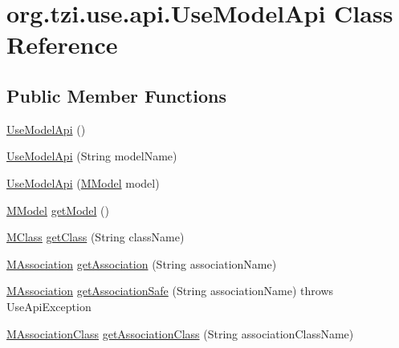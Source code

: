 \hypertarget{classorg_1_1tzi_1_1use_1_1api_1_1_use_model_api}{\section{org.\-tzi.\-use.\-api.\-Use\-Model\-Api Class Reference}
\label{classorg_1_1tzi_1_1use_1_1api_1_1_use_model_api}
}
\subsection*{Public Member Functions}
\begin{DoxyCompactItemize}
\item 
\hyperlink{classorg_1_1tzi_1_1use_1_1api_1_1_use_model_api_a8771dcfe5fbfff7b9dd39e2ab838dda9}{Use\-Model\-Api} ()
\item 
\hyperlink{classorg_1_1tzi_1_1use_1_1api_1_1_use_model_api_ae19c8c6bdd9a600347fea10d10f83c91}{Use\-Model\-Api} (String model\-Name)
\item 
\hyperlink{classorg_1_1tzi_1_1use_1_1api_1_1_use_model_api_a5917d6c8644a6d3a1e532ea49b1eb60b}{Use\-Model\-Api} (\hyperlink{classorg_1_1tzi_1_1use_1_1uml_1_1mm_1_1_m_model}{M\-Model} model)
\item 
\hyperlink{classorg_1_1tzi_1_1use_1_1uml_1_1mm_1_1_m_model}{M\-Model} \hyperlink{classorg_1_1tzi_1_1use_1_1api_1_1_use_model_api_a46239807ec4c095b99b088d245c14c5e}{get\-Model} ()
\item 
\hyperlink{interfaceorg_1_1tzi_1_1use_1_1uml_1_1mm_1_1_m_class}{M\-Class} \hyperlink{classorg_1_1tzi_1_1use_1_1api_1_1_use_model_api_a9cc78ca02c4923feedb8dc939e829912}{get\-Class} (String class\-Name)
\item 
\hyperlink{interfaceorg_1_1tzi_1_1use_1_1uml_1_1mm_1_1_m_association}{M\-Association} \hyperlink{classorg_1_1tzi_1_1use_1_1api_1_1_use_model_api_a5dfba9cc61fbe37e2c5dbd68f6e22ea4}{get\-Association} (String association\-Name)
\item 
\hyperlink{interfaceorg_1_1tzi_1_1use_1_1uml_1_1mm_1_1_m_association}{M\-Association} \hyperlink{classorg_1_1tzi_1_1use_1_1api_1_1_use_model_api_a640e5bf501f70cc2191d9e0ca54c24c0}{get\-Association\-Safe} (String association\-Name)  throws Use\-Api\-Exception 
\item 
\hyperlink{interfaceorg_1_1tzi_1_1use_1_1uml_1_1mm_1_1_m_association_class}{M\-Association\-Class} \hyperlink{classorg_1_1tzi_1_1use_1_1api_1_1_use_model_api_a1b234a3f8b506236dded5307663db5d1}{get\-Association\-Class} (String association\-Class\-Name)

\end{DoxyCompactItemize}
